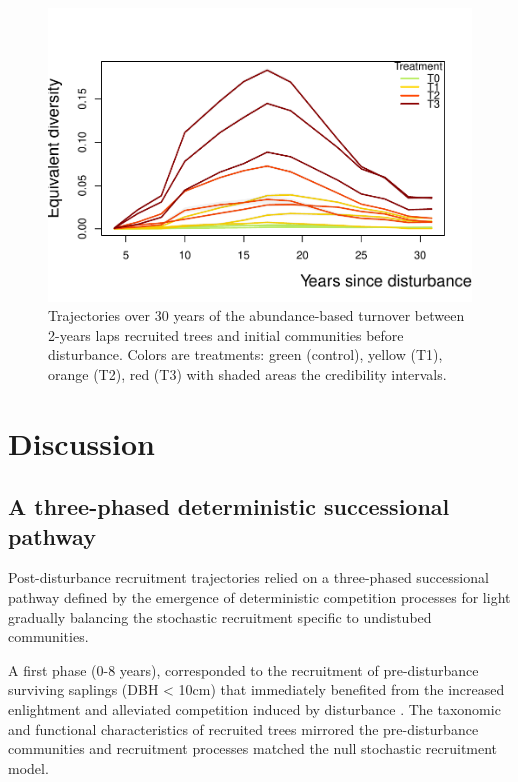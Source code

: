 \documentclass[fleqn,10pt]{ArtEcoFoG} %
\begin{document}
\begin{figure}

{\centering \includegraphics[width=1\linewidth]{RecruitmentTrajectories_files/figure-latex/Turnover-1} 

}

\caption{Trajectories over 30 years of the abundance-based turnover between 2-years laps recruited trees and initial communities before disturbance. Colors are treatments: green (control), yellow (T1), orange (T2), red (T3) with shaded areas the credibility intervals.}\label{fig:Turnover}
\end{figure}

\section{Discussion}\label{discussion}

\subsection{A three-phased deterministic successional
pathway}\label{a-three-phased-deterministic-successional-pathway}

Post-disturbance recruitment trajectories relied on a three-phased
successional pathway defined by the emergence of deterministic
competition processes for light gradually balancing the stochastic
recruitment specific to undistubed communities.

A first phase (0-8 years), corresponded to the recruitment of
pre-disturbance surviving saplings (DBH \textless{} 10cm) that
immediately benefited from the increased enlightment and alleviated
competition induced by disturbance \citep{Denslow2000, Herault2010}. The
taxonomic and functional characteristics of recruited trees mirrored the
pre-disturbance communities and recruitment processes matched the null
stochastic recruitment model.
\end{document}
